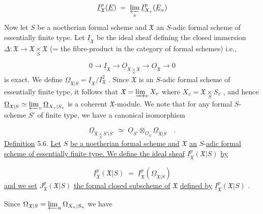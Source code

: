 \begin{equation*}
\underline{I}^p_{\mathfrak{X}}(\underline{E}) \;=\; \varprojlim_{v} \underline{I}^p_{X_v}(\underline{E}_v)
\end{equation*}
Now let $S$ be a noetherian formal scheme and $\mathfrak{X}$ an $S$-adic formal scheme of essentially finite type. Let $\underline{I}_{\mathfrak{X}}$ be the ideal sheaf defining the closed immersion $\Delta : \mathfrak{X} \to \mathfrak{X} \underset{S}{\times} \mathfrak{X}$ (= the fibre-product in the category of formal schemes) i.e.,

\begin{equation*}
0 \to \underline{I}_{\mathfrak{X}} \to \underline{O}_{\mathfrak{X} \underset{S}{\times} \mathfrak{X}} \to \underline{O}_{\mathfrak{X}} \to 0
\end{equation*}
is exact. We define $\underline{\Omega}_{\mathfrak{X}|S} = \underline{I}_{\mathfrak{X}}/I^2_{\mathfrak{X}}$ . Since $\mathfrak{X}$ is an $S$-adic formal scheme of essentially finite type, it follows that $\mathfrak{X} = \varinjlim_{v} X_v$ where $X_v = \mathfrak{X} \underset{S}{\times} S_v$ , and hence $\underline{\Omega}_{\mathfrak{X}|S} \simeq \varprojlim_{v} \underline{\Omega}_{X_v|S_v}$ is a coherent $\mathfrak{X}$-module. We note that for any formal $S$-scheme $S'$ of finite type, we have a canonical isomorphism

\begin{equation*}
\underline{\Omega}_{\mathfrak{X} \underset{S}{\times} S'|S'} \;\simeq\; \underline{O}_{S'} \otimes_{\underline{O}_S} \underline{\Omega}_{\mathfrak{X}|S} \quad .
\end{equation*}
\underline{Definition} 5.6. \underline{Let} $S$ \underline{be a noetherian formal scheme and} $\mathfrak{X}$ \underline{an} $S$-\underline{adic formal scheme of essentially finite type. We define the ideal sheaf} $\underline{I}^p_{\mathfrak{X}}(\mathfrak{X}|S)$ \underline{by}

\begin{equation*}
\underline{I}^p_{\mathfrak{X}}(\mathfrak{X}|S) \;=\; \underline{I}^p_{\mathfrak{X}}(\underline{\Omega}_{\mathfrak{X}|S})
\end{equation*}
\underline{and we set} $J^p_{\mathfrak{X}}(\mathfrak{X}|S)$ \underline{the formal closed subscheme of} $\mathfrak{X}$ \underline{defined by} $\underline{I}^p_{\mathfrak{X}}(\mathfrak{X}|S)$ .

Since $\Omega_{\mathfrak{X}|S} = \varprojlim_{n} \Omega_{X_n|S_n}$ we have 



